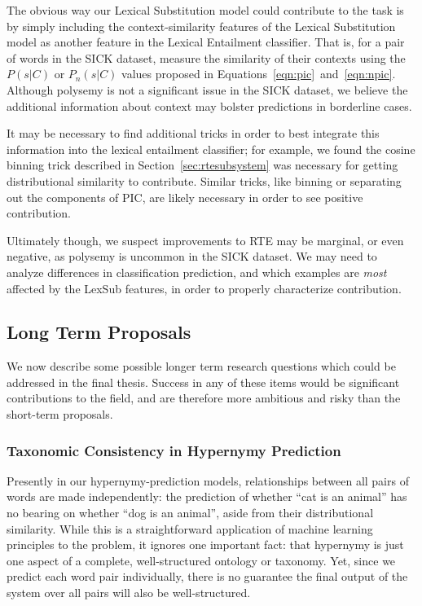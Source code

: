 \documentclass[12pt]{article}
\begin{document}
The obvious way our Lexical Substitution model could contribute to the
task is by simply including the context-similarity features of the Lexical
Substitution model as another feature in the Lexical Entailment classifier.
That is, for a pair of words in the SICK dataset, measure the similarity of
their contexts using the $P(s|C)$ or $P_n(s|C)$ values proposed in
Equations~\ref{eqn:pic}~and~\ref{eqn:npic}. Although polysemy is not a
significant issue in the SICK dataset, we believe the additional information
about context may bolster predictions in borderline cases.

It may be necessary to find additional tricks in order to best integrate
this information into the lexical entailment classifier; for example, we
found the cosine binning trick described in Section~\ref{sec:rtesubsystem}
was necessary for getting distributional similarity to contribute. Similar
tricks, like binning or separating out the components of PIC, are likely
necessary in order to see positive contribution.

Ultimately though, we suspect improvements to RTE  may be marginal, or even
negative, as polysemy is uncommon in the SICK dataset. We may need to analyze
differences in classification prediction, and which examples are {\em most}
affected by the LexSub features, in order to properly characterize contribution.

\subsection{Long Term Proposals}

We now describe some possible longer term research questions which could be
addressed in the final thesis. Success in any of these items would
be significant contributions to the field, and are therefore more ambitious and
risky than the short-term proposals.

\subsubsection{Taxonomic Consistency in Hypernymy Prediction}

Presently in our hypernymy-prediction models, relationships between all
pairs of words are made independently: the prediction of whether ``cat is an
animal'' has no bearing on whether ``dog is an animal'', aside from their
distributional similarity. While this is a straightforward application of
machine learning principles to the problem, it ignores one important fact: that
hypernymy is just one aspect of a complete, well-structured ontology or
taxonomy. Yet, since we predict each word pair individually, there is no
guarantee the final output of the system over all pairs will also be
well-structured.
\end{document}
